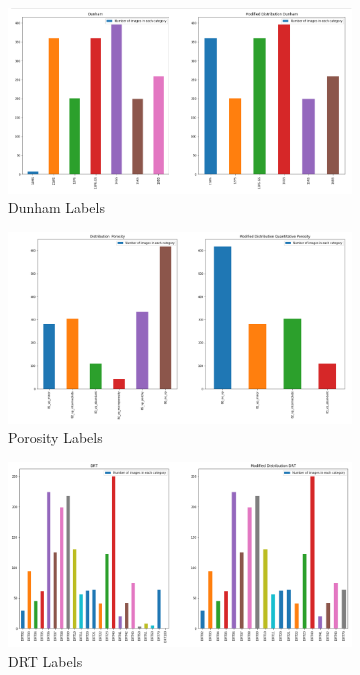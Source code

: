 \begin{figure}
\begin{subfigure}{.5\textwidth}
  \centering
  \includegraphics[width=.8\linewidth]{figures/03-Dunham.PNG}
  \caption{Dunham Labels}
  \label{fig:dunhamlab}
\end{subfigure}%
\begin{subfigure}{.5\textwidth}
  \centering
  \includegraphics[width=.8\linewidth]{figures/03-porosity_baby.PNG}
  \caption{Porosity Labels}
  \label{fig:porolab}
\end{subfigure}
\begin{subfigure}{.5\textwidth}
  \centering
  \includegraphics[width=.8\linewidth]{figures/03-DRT.PNG}
  \caption{DRT Labels}
  \label{fig:drtlab}
\end{subfigure}%
\begin{subfigure}{.5\textwidth}

\end{subfigure}
\end{figure}
